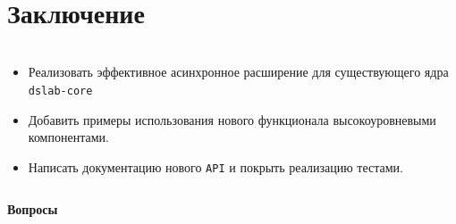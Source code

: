 \documentclass[t]{beamer}  %
\begin{document}
\section{Заключение}

\begin{frame}[fragile]
	\frametitle{\insertsection} 
	\framesubtitle{\insertsubsection}

	\vspace{-0.5cm}
	\begin{columns}
		\begin{column}{1.1\linewidth}
			\begin{itemize}
				\item[\ding{51}] Реализовать эффективное асинхронное расширение для существующего ядра \texttt{dslab-core}
				\item[\ding{51}] Добавить примеры использования нового функционала высокоуровневыми компонентами.
				\item[\ding{51}] Написать документацию нового \texttt{API} и покрыть реализацию тестами.
			\end{itemize}

		\end{column}
	\end{columns}
\end{frame}

\begin{frame}{}
	\centering
	\vspace{3.5cm}
\Huge \textcolor{HSEblue}{\textbf{Вопросы}}

\end{frame}
\end{document}
